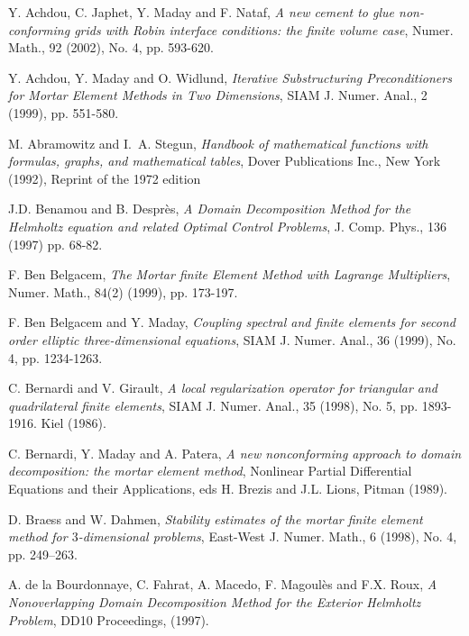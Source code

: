 \documentclass[final]{siamltex}
\begin{document}
\begin{thebibliography}{10} 

 {\sc Y. Achdou, C. Japhet, Y. Maday and F. Nataf}, {\em
  A new cement to glue non-conforming grids with Robin interface
  conditions: the finite volume case}, Numer. Math., 92 (2002), No. 4,
  pp. 593-620.

 {\sc Y. Achdou, Y. Maday and O. Widlund}, {\em Iterative
  Substructuring Preconditioners for Mortar Element Methods in Two
  Dimensions}, SIAM J. Numer. Anal., 2 (1999), pp. 551-580.
  
 {\sc M. Abramowitz and I.~A. Stegun}, 
{\em Handbook of mathematical functions with formulas, graphs, and
mathematical tables}, Dover Publications Inc., New York (1992), Reprint of the 1972 edition
  
 {\sc J.D. Benamou and B. Despr\`es}, {\em A
  Domain Decomposition Method for the Helmholtz equation and related
  Optimal Control Problems}, J. Comp. Phys., 136 (1997) pp. 68-82.

 {\sc F. Ben Belgacem}, {\em The Mortar finite Element
  Method with Lagrange Multipliers}, Numer. Math., 84(2) (1999),
  pp. 173-197.

 {\sc F. Ben Belgacem and Y. Maday}, {\em Coupling
  spectral and finite elements for second order elliptic
  three-dimensional equations}, SIAM J. Numer. Anal., 36 (1999),
  No. 4, pp. 1234-1263.

 {\sc C. Bernardi and V. Girault}, {\em A local
  regularization operator for triangular and quadrilateral finite
  elements}, SIAM J. Numer. Anal., 35 (1998), No. 5, pp. 1893-1916.
  Kiel (1986).
  
 {\sc C. Bernardi, Y. Maday and A. Patera}, {\em A new
  nonconforming approach to domain decomposition: the mortar element
  method}, Nonlinear Partial Differential Equations and their
  Applications, eds H. Brezis and J.L. Lions, Pitman (1989).

 {\sc D. Braess and W. Dahmen}, {\em Stability
  estimates of the mortar finite element method for $3$-dimensional
  problems}, East-West J. Numer. Math., 6 (1998), No. 4, pp. 249--263.
   
 {\sc A. de la Bourdonnaye, C. Fahrat, A. Macedo,
  F. Magoul\`es and F.X. Roux}, {\em A Nonoverlapping Domain
  Decomposition Method for the Exterior Helmholtz Problem}, DD10
  Proceedings, (1997).


\end{thebibliography}
\end{document}
